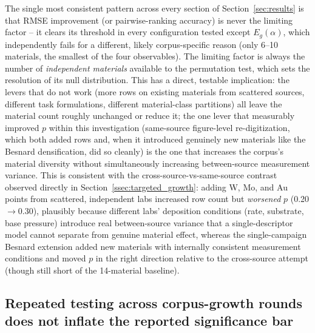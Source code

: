 \documentclass[aip,amsmath,amssymb,reprint]{revtex4-1}
\begin{document}
The single most consistent pattern across every section of
Section~\ref{sec:results} is that RMSE improvement (or pairwise-ranking
accuracy) is never the limiting factor -- it clears its threshold in
every configuration tested except $E_g(\alpha)$, which independently
fails for a different, likely corpus-specific reason (only 6--10
materials, the smallest of the four observables). The limiting factor
is always the number of \emph{independent materials} available to the
permutation test, which sets the resolution of its null distribution.
This has a direct, testable implication: the levers that do not work
(more rows on existing materials from scattered sources, different
task formulations, different material-class partitions) all leave the
material count roughly unchanged or reduce it; the one lever that
measurably improved $p$ within this investigation (same-source
figure-level re-digitization, which both added rows and, when it
introduced genuinely new materials like the Besnard densification, did
so cleanly) is the one that increases the corpus's material diversity
without simultaneously increasing between-source measurement variance.
This is consistent with the cross-source-vs-same-source contrast
observed directly in Section~\ref{ssec:targeted_growth}: adding W, Mo,
and Au points from scattered, independent labs increased row count but
\emph{worsened} $p$ (0.20$\rightarrow$0.30), plausibly because
different labs' deposition conditions (rate, substrate, base pressure)
introduce real between-source variance that a single-descriptor model
cannot separate from genuine material effect, whereas the
single-campaign Besnard extension added new materials with internally
consistent measurement conditions and moved $p$ in the right direction
relative to the cross-source attempt (though still short of the
14-material baseline).

\subsection{Repeated testing across corpus-growth rounds does not inflate the reported significance bar}
\label{ssec:disc_multipletesting}
\end{document}

